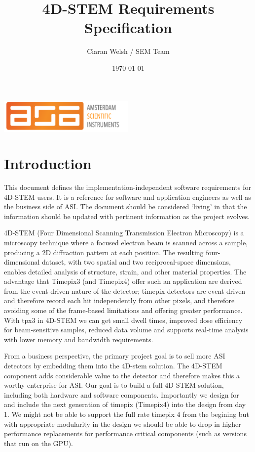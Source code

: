 \documentclass[10pt]{article}
\title{4D-STEM Requirements Specification}
\author{Ciaran Welsh / SEM Team}
\date{\today}
\begin{document}
    \maketitle

    \begin{center}
        \includegraphics[width=0.5\textwidth]{asi-logo}
    \end{center}

    \tableofcontents
    \newpage


    \section{Introduction}\label{sec:intro}
    This document defines the implementation-independent software requirements for 4D-STEM users. It is a reference for software and application engineers as well as the business side of ASI. The document should be considered `living' in that the information should be updated with pertinent information as the project evolves.

    4D-STEM (Four Dimensional Scanning Transmission Electron Microscopy) is a microscopy technique where a focused electron beam is scanned across a sample, producing a 2D diffraction pattern at each position. The resulting four-dimensional dataset, with two spatial and two reciprocal-space dimensions, enables detailed analysis of structure, strain, and other material properties. The advantage that Timepix3 (and Timepix4) offer such an application are derived from the event-driven nature of the detector; timepix detectors are event driven and therefore record each hit independently from other pixels, and therefore avoiding some of the frame-based limitations and offering greater performance.
    With tpx3 in 4D-STEM we can get small dwell times, improved dose efficiency for beam-sensitive samples, reduced data volume and supports real-time analysis with lower memory and bandwidth requirements.

    From a business perspective, the primary project goal is to sell more ASI detectors by embedding them into the 4D-stem solution. The 4D-STEM component adds considerable value to the detector and therefore makes this a worthy enterprise for ASI. Our goal is to build a full 4D-STEM solution, including both hardware and software components. Importantly we design for and include the next generation of timepix (Timepix4) into the design from day 1. We might not be able to support the full rate timepix 4 from the begining but with appropriate modularity in the design we should be able to drop in higher performance replacements for performance critical components (such as versions that run on the GPU).
\end{document}
